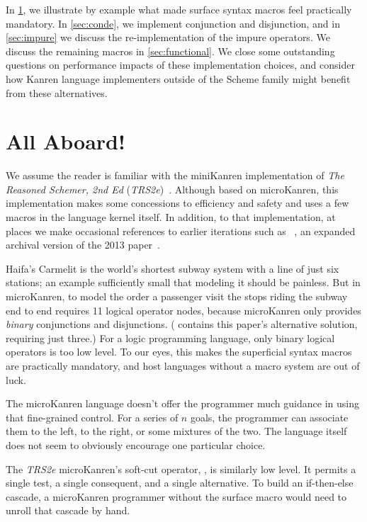 \documentclass[sigplan,draft,balance,pbalance,natbib=false]{acmart}
\begin{document}
In \cref{sec:all-aboard}, we illustrate by example what made surface
syntax macros feel practically mandatory. In \cref{sec:conde}, we
implement conjunction and disjunction, and in \cref{sec:impure} we
discuss the re-implementation of the impure operators. We discuss the
remaining macros in \cref{sec:functional}. We close some outstanding
questions on performance impacts of these implementation choices, and
consider how Kanren language implementers outside of the Scheme family
might benefit from these alternatives.

\section{All Aboard!}\label{sec:all-aboard}

We assume the reader is familiar with the miniKanren implementation of
\emph{The Reasoned Schemer, 2nd Ed}
(\emph{TRS2e})~\cite{friedman2018reasoned}. Although based on
microKanren, this implementation makes some concessions to efficiency
and safety and uses a few macros in the language kernel itself. In
addition, to that implementation, at places we make occasional
references to earlier iterations such as
\citeauthor{hemann2016small}~\cite{hemann2016small}, an expanded
archival version of the 2013 paper~\cite{hemann2013muKanren}.

Haifa's Carmelit is the world's shortest subway system with a line of
just six stations; an example sufficiently small that modeling it
should be painless. But in microKanren, to model the order a passenger
visit the stops riding the subway end to end requires 11 logical
operator nodes, because microKanren only provides \emph{binary}
conjunctions and disjunctions. ( contains this
paper's alternative solution, requiring just three.) For a logic
programming language, only binary logical operators is too low level.
To our eyes, this makes the superficial syntax macros are practically
mandatory, and host languages without a macro system are out of luck.

The microKanren language doesn't offer the programmer much guidance in
using that fine-grained control. For a series of $n$ goals, the
programmer can associate them to the left, to the right, or some
mixtures of the two. The language itself does not seem to obviously
encourage one particular choice.

The \emph{TRS2e} microKanren's soft-cut operator, ,
is similarly low level. It permits a single test, a single consequent,
and a single alternative. To build an if-then-else cascade, a
microKanren programmer without the  surface macro
would need to unroll that cascade by hand.
\end{document}
